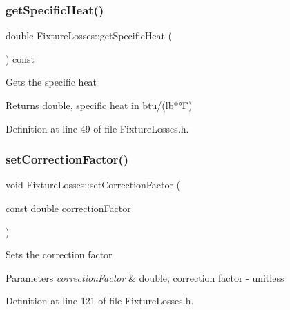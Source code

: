 \subsubsection{\texorpdfstring{get\+Specific\+Heat()}{getSpecificHeat()}\hspace{0.1cm}{\footnotesize\ttfamily [3/3]}}
{\footnotesize\ttfamily double Fixture\+Losses\+::get\+Specific\+Heat (\begin{DoxyParamCaption}{ }\end{DoxyParamCaption}) const\hspace{0.3cm}{\ttfamily [inline]}}

Gets the specific heat \begin{DoxyReturn}{Returns}
double, specific heat in btu/(lb$\ast$°F) 
\end{DoxyReturn}


Definition at line 49 of file Fixture\+Losses.\+h.

\mbox{\label{class_fixture_losses_a3a3dd839d71adb630e7ce76644f18098}} 
\subsubsection{\texorpdfstring{set\+Correction\+Factor()}{setCorrectionFactor()}\hspace{0.1cm}{\footnotesize\ttfamily [1/3]}}
{\footnotesize\ttfamily void Fixture\+Losses\+::set\+Correction\+Factor (\begin{DoxyParamCaption}\item[{const double}]{correction\+Factor }\end{DoxyParamCaption})\hspace{0.3cm}{\ttfamily [inline]}}

Sets the correction factor 
\begin{DoxyParams}{Parameters}
{\em correction\+Factor} & double, correction factor -\/ unitless \\
\hline
\end{DoxyParams}


Definition at line 121 of file Fixture\+Losses.\+h.

\mbox{\label{class_fixture_losses_a3a3dd839d71adb630e7ce76644f18098}} 
